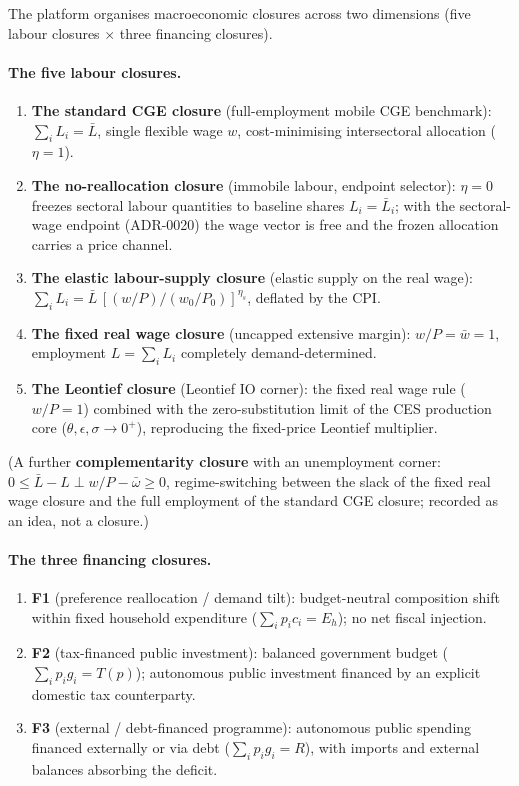 The platform organises macroeconomic closures across two dimensions (five
labour closures $\times$ three financing closures).

\paragraph{The five labour closures.}
\begin{enumerate}
\item \textbf{The standard CGE closure} (full-employment mobile CGE benchmark):
  $\sum_i L_i = \bar L$, single flexible wage $w$, cost-minimising
  intersectoral allocation ($\eta = 1$).
\item \textbf{The no-reallocation closure} (immobile labour, endpoint
  selector): $\eta = 0$ freezes
  sectoral labour quantities to baseline shares $L_i = \bar L_i$; with the
  sectoral-wage endpoint (ADR-0020) the wage vector is free and the frozen
  allocation carries a price channel.
\item \textbf{The elastic labour-supply closure} (elastic supply on the real
  wage):
  $\sum_i L_i = \bar L\,[(w/P)/(w_0/P_0)]^{\eta_s}$, deflated by the CPI.
\item \textbf{The fixed real wage closure} (uncapped extensive margin):
  $w/P = \bar w = 1$, employment $L = \sum_i L_i$ completely
  demand-determined.
\item \textbf{The Leontief closure} (Leontief IO corner): the fixed real
  wage rule ($w/P = 1$) combined with
  the zero-substitution limit of the CES production core
  ($\theta, \epsilon, \sigma \to 0^+$), reproducing the fixed-price Leontief
  multiplier.
\end{enumerate}
(A further \textbf{complementarity closure} with an unemployment corner: $0 \le
\bar L - L \perp w/P -
\bar\omega \ge 0$, regime-switching between the slack of the fixed real
wage closure and the full employment of the standard CGE closure; recorded
as an idea, not a closure.)

\paragraph{The three financing closures.}
\begin{enumerate}
\item \textbf{F1} (preference reallocation / demand tilt): budget-neutral
  composition shift within fixed household expenditure
  ($\sum_i p_i c_i = E_h$); no net fiscal injection.
\item \textbf{F2} (tax-financed public investment): balanced government
  budget ($\sum_i p_i g_i = T(p)$); autonomous public investment financed by
  an explicit domestic tax counterparty.
\item \textbf{F3} (external / debt-financed programme): autonomous public
  spending financed externally or via debt ($\sum_i p_i g_i = R$), with
  imports and external balances absorbing the deficit.
\end{enumerate}

